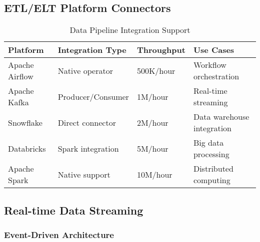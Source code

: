 \subsection{ETL/ELT Platform Connectors}

\begin{table}[H]
\centering
\caption{Data Pipeline Integration Support}
\begin{tabular}{|p{3cm}|p{3cm}|p{2cm}|p{4cm}|}
\hline
\textbf{Platform} & \textbf{Integration Type} & \textbf{Throughput} & \textbf{Use Cases} \\
\hline
Apache Airflow & Native operator & 500K/hour & Workflow orchestration \\
\hline
Apache Kafka & Producer/Consumer & 1M/hour & Real-time streaming \\
\hline
Snowflake & Direct connector & 2M/hour & Data warehouse integration \\
\hline
Databricks & Spark integration & 5M/hour & Big data processing \\
\hline
Apache Spark & Native support & 10M/hour & Distributed computing \\
\hline
\end{tabular}
\end{table}

\subsection{Real-time Data Streaming}

\subsubsection{Event-Driven Architecture}

